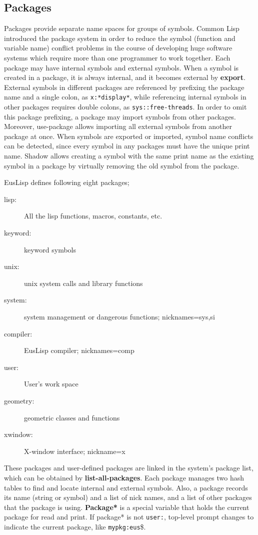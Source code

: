 \subsection{Packages}

Packages provide separate name spaces for groups of symbols.
Common Lisp introduced the package system in order to reduce the
symbol (function and variable name) conflict problems 
in the course of developing huge software systems
which require more than one programmer to work together.
Each package may have internal symbols and external symbols.
When a symbol is created in a package, it is always internal,
and it becomes external by {\bf export}. External symbols in different
packages are referenced by prefixing the package name and a single colon,
as {\tt x:*display*}, while referencing internal symbols in other packages
requires double colons, as {\tt sys::free-threads}.
In order to omit this package prefixing, a package may {\bfx import} symbols
from other packages.
Moreover, {\bfx use-package} allows importing all external symbols
from another package at once.
When symbols are exported or imported, symbol name conflicts can be detected,
since every symbol in any packages must have the unique print name.
{\bfx Shadow} allows creating a symbol with the same print name as the
existing symbol in a package by virtually removing the old symbol from 
the package.

EusLisp defines following eight packages;
\begin{description}
\item [lisp:] All the lisp functions, macros, constants, etc.
\item [keyword:] keyword symbols 
\item [unix:] unix system calls and library functions
\item [system:] system management or dangerous functions; nicknames=sys,si
\item [compiler:] EusLisp compiler; nicknames=comp
\item [user:] User's work space
\item [geometry:] geometric classes and functions
\item [xwindow:] X-window interface; nickname=x
\end{description}

These packages and user-defined packages are linked in the system's 
package list, which can be obtained by {\bf list-all-packages}.
Each package manages two hash tables to find and locate internal and
external symbols.
Also, a package records its name (string or symbol) and a list of nick names,
and a list of other packages that the package is using.
{\bf *Package*} is a special variable
that holds the current package for read and print.
If {\bfx *package*} is not {\tt user:},
top-level prompt changes to indicate the current package,
like {\tt mypkg:eus}\$.

